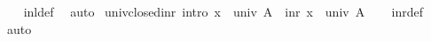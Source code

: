 \begin{isabellebody}
%
\isadelimproof
\ \ %
\endisadelimproof
%
\isatagproof
{}\isamarkupfalse%
\ inl{\isacharunderscore}{\kern0pt}def\ \isamarkupfalse%
\ auto%
\endisatagproof
{\isafoldproof}%
%
\isadelimproof
\isanewline
%
\endisadelimproof
\isanewline
{}\isamarkupfalse%
\ univ{\isacharunderscore}{\kern0pt}closed{\isacharunderscore}{\kern0pt}inr\ {\isacharbrackleft}{\kern0pt}intro{\isacharbang}{\kern0pt}{\isacharbrackright}{\kern0pt}{\isacharcolon}{\kern0pt}\ {\isachardoublequoteopen}x\ {\isasymin}\ univ\ A\ {\isasymLongrightarrow}\ inr\ x\ {\isasymin}\ univ\ A{\isachardoublequoteclose}\isanewline
%
\isadelimproof
\ \ %
\endisadelimproof
%
\isatagproof
{}\isamarkupfalse%
\ inr{\isacharunderscore}{\kern0pt}def\ \isamarkupfalse%
\ auto%
\endisatagproof
{\isafoldproof}%
%
\isadelimproof
\isanewline
%
\endisadelimproof
\isanewline
%
\isadelimtheory
\isanewline
%
\endisadelimtheory
%
\isatagtheory
{}\isamarkupfalse%
%
\endisatagtheory
{\isafoldtheory}%
%
\isadelimtheory
%
\endisadelimtheory
%
\end{isabellebody}%
\endinput
